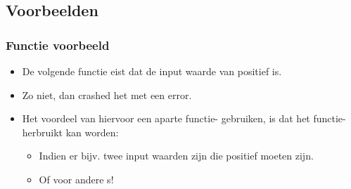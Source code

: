 \subsection{Voorbeelden}


\begin{frame}
\frametitle{Functie voorbeeld}

\begin{itemize}
  \item De volgende functie eist dat de input waarde van  positief is.
  \item Zo niet, dan crashed het  met een error.
  \item Het voordeel van hiervoor een aparte functie- gebruiken, is dat het functie- herbruikt kan worden:
  \begin{itemize}
    \item Indien er bijv. twee input waarden zijn die positief moeten zijn.
    \item Of voor andere s!
  \end{itemize}
\end{itemize}

\vspace{2.5cm}




\end{frame}
